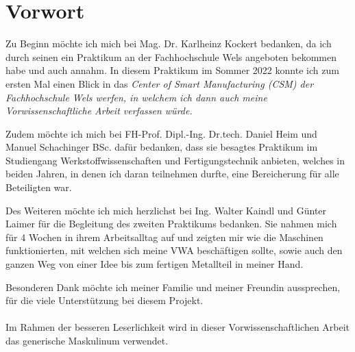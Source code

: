 \documentclass[../main.tex]{subfiles}
\begin{document}
\section*{Vorwort}
Zu Beginn möchte ich mich bei Mag. Dr. Karlheinz Kockert bedanken, da ich durch seinen  ein Praktikum an der Fachhochschule Wels angeboten bekommen habe und auch annahm. In diesem Praktikum im Sommer 2022 konnte ich zum ersten Mal einen Blick in das \it{Center of Smart Manufacturing (CSM)} der Fachhochschule Wels werfen, in welchem ich dann auch meine Vorwissenschaftliche Arbeit verfassen würde. 

Zudem möchte ich mich bei FH-Prof. Dipl.-Ing. Dr.tech. Daniel Heim und Manuel Schachinger BSc. dafür bedanken, dass sie besagtes Praktikum im Studiengang Werkstoffwissenschaften und Fertigungstechnik anbieten, welches in beiden Jahren, in denen ich daran teilnehmen durfte, eine Bereicherung für alle Beteiligten war.

Des Weiteren möchte ich mich herzlichst bei Ing. Walter Kaindl und  Günter Laimer für die Begleitung des zweiten Praktikums bedanken. Sie nahmen mich für 4 Wochen in ihrem Arbeitsalltag auf und zeigten mir wie die Maschinen funktionierten, mit welchen sich meine VWA beschäftigen sollte, sowie auch den ganzen Weg von einer Idee bis zum fertigen Metallteil in meiner Hand.

Besonderen Dank möchte ich meiner Familie und meiner Freundin aussprechen, für die viele Unterstützung bei diesem Projekt.
\\\\
Im Rahmen der besseren Leserlichkeit wird in dieser Vorwissenschaftlichen Arbeit das generische Maskulinum verwendet.
\end{document}
